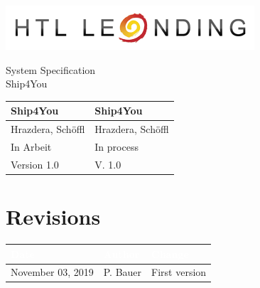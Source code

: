 \documentclass[12pt]{article}
\theoremstyle{definition}
\newcommand{\projectname}{Ship4You}
\newcommand{\productname}{Ship4You}
\newcommand{\projectleader}{Hrazdera, Schöffl}
\newcommand{\documentstatus}{In process}
\newcommand{\version}{V. 1.0}
\begin{document}
\begin{titlepage}
\begin{flushright}
\includegraphics[scale=.5]{htlleondinglogo.png}\\
\end{flushright}

\vspace{10em}

\begin{center}
{\Huge System Specification} \\[3em]
{\LARGE \productname} \\[3em]
\end{center}

\begin{flushleft}
\begin{tabular}{|l|l|}
\hline
Ship4You & \projectname \\ \hline
Hrazdera, Schöffl & \projectleader \\ \hline
In Arbeit & \documentstatus \\ \hline
Version 1.0 & \version \\ \hline
\end{tabular}
\end{flushleft}

\end{titlepage}
\section*{Revisions}
\begin{tabular}{|l|l|l|}
\hline
\cellcolor[gray]{0.5}\textcolor{white}{Date} & \cellcolor[gray]{0.5}\textcolor{white}{Author} & \cellcolor[gray]{0.5}\textcolor{white}{Change} \\ \hline
November 03, 2019&P. Bauer&First version \\ \hline
\end{tabular}
\pagebreak

\tableofcontents
\pagebreak
\end{document}
